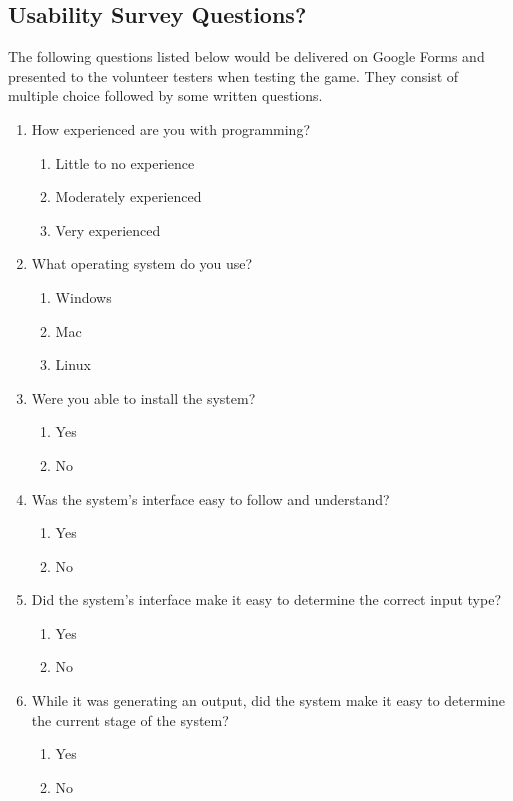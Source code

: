 \documentclass[12pt, titlepage]{article}
\begin{document}
\subsection{Usability Survey Questions?}
The following questions listed below would be delivered on Google Forms and presented to the volunteer testers when testing the game. They consist of multiple choice followed by some written questions.
\begin{enumerate}

\item How experienced are you with programming?
   \begin{enumerate}
     \item Little to no experience
     \item Moderately experienced
     \item Very experienced
   \end{enumerate}

\item What operating system do you use?
   \begin{enumerate}
     \item Windows
     \item Mac
     \item Linux
   \end{enumerate}

\item Were you able to install the system?
   \begin{enumerate}
     \item Yes
     \item No
   \end{enumerate}
   
\item Was the system's interface easy to follow and understand?
   \begin{enumerate}
     \item Yes
     \item No
   \end{enumerate}

\item Did the system's interface make it easy to determine the correct input type?
   \begin{enumerate}
     \item Yes
     \item No
   \end{enumerate}

\item While it was generating an output, did the system make it easy to determine the current stage of the system?
   \begin{enumerate}
     \item Yes
     \item No
   \end{enumerate}


\end{enumerate}
\end{document}
